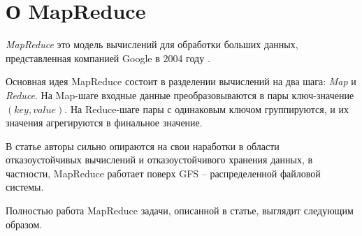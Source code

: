 \documentclass[../diploma.tex]{subfile}
\begin{document}
    \section{О MapReduce}\label{sec:whatismapreduce}
    
    \textit{MapReduce} это модель вычислений для обработки больших данных,
    представленная компанией Google в 2004 году \cite{google_mapreduce}. 
    
    Основная идея MapReduce состоит в разделении вычислений на два шага:
    \textit{Map} и \textit{Reduce}. На Map-шаге входные данные преобразовываются
    в пары ключ-значение $(key, value)$. На Reduce-шаге пары с одинаковым ключом
    группируются, и их значения агрегируются в финальное значение. 

    В статье авторы сильно опираются на свои наработки в области
    отказоустойчивых вычислений и отказоустойчивого хранения данных, в
    частности, MapReduce работает поверх GFS \cite{google_gfs} -- распределенной
    файловой системы. 

    Полностью работа MapReduce задачи, описанной в статье, выглядит следующим
    образом.    
\end{document}
